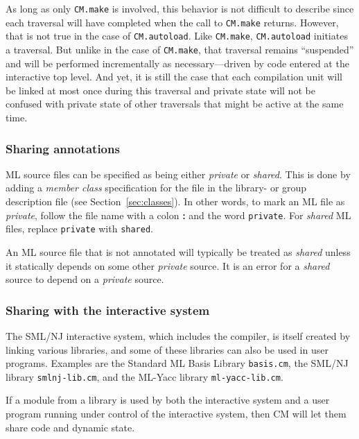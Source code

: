 \documentclass{article}
\begin{document}
As long as only {\tt CM.make} is involved, this behavior is not
difficult to describe since each traversal will have completed when
the call to {\tt CM.make} returns.  However, that is not true in the
case of {\tt CM.autoload}.  Like {\tt CM.make}, {\tt CM.autoload}
initiates a traversal. But unlike in the case of {\tt CM.make}, that
traversal remains ``suspended'' and will be performed incrementally as
necessary---driven by code entered at the interactive top level.  And
yet, it is still the case that each compilation unit will be linked at
most once during this traversal and private state will not be confused
with private state of other traversals that might be active at the
same time.


\subsubsection*{Sharing annotations}

ML source files can be specified as being either {\em private} or {\em
shared}.  This is done by adding a {\em member class} specification
for the file in the library- or group description file (see
Section~\ref{sec:classes}).  In other words, to mark an ML file as
{\em private}, follow the file name with a colon {\bf :} and the word
{\tt private}.  For {\em shared} ML files, replace {\tt private} with
{\tt shared}.

An ML source file that is not annotated will typically be treated as
{\em shared} unless it statically depends on some other {\em private}
source.  It is an error for a {\em shared} source to depend on a {\em
private} source.

\subsubsection*{Sharing with the interactive system}

The SML/NJ interactive system, which includes the compiler, is itself
created by linking various libraries, and some of these libraries can
also be used in user programs.  Examples are the Standard ML Basis
Library {\tt basis.cm}, the SML/NJ library {\tt smlnj-lib.cm}, and the
ML-Yacc library {\tt ml-yacc-lib.cm}.

If a module from a library is used by both the interactive system and
a user program running under control of the interactive system, then
CM will let them share code and dynamic state.
\end{document}
